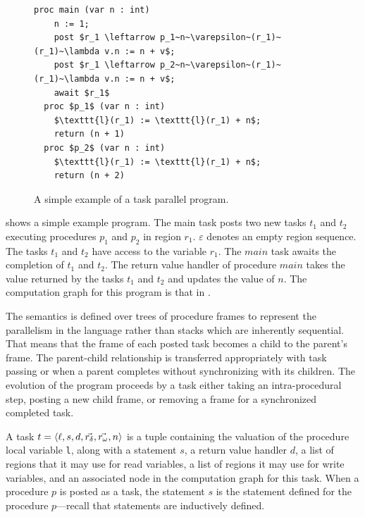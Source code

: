 \begin{figure}
\vspace{-1em}
  \begin{center}
    \begin{lstlisting}[mathescape=true]
  proc main (var n : int)
  	n := 1;
	post $r_1 \leftarrow p_1~n~\varepsilon~(r_1)~(r_1)~\lambda v.n := n + v$;
	post $r_1 \leftarrow p_2~n~\varepsilon~(r_1)~(r_1)~\lambda v.n := n + v$;
	await $r_1$
  proc $p_1$ (var n : int)
  	$\texttt{l}(r_1) := \texttt{l}(r_1) + n$;
	return (n + 1)
  proc $p_2$ (var n : int)
  	$\texttt{l}(r_1) := \texttt{l}(r_1) + n$;
	return (n + 2)
\end{lstlisting}
  \end{center}
  \vspace{-2em}
  \caption{A simple example of a task parallel program.}
  \label{fig:hj-async-finish}
  \vspace{-1em}
\end{figure}

 shows a simple example program. The main task posts two new tasks $t_1$ and $t_2$ executing procedures $p_1$ and $p_2$ in region $r_1$. $\varepsilon$ denotes an empty region sequence. The tasks $t_1$ and $t_2$ have access to the variable $r_1$. The $main$ task awaits the completion of $t_1$ and $t_2$. The return value handler of procedure $main$ takes the value returned by the tasks $t_1$ and $t_2$ and updates the value of $n$. The computation graph for this program is that in .


The semantics is defined over trees of procedure frames to represent the parallelism in the language rather than stacks which are inherently sequential. That means that the frame of each posted task becomes a child to the parent's frame. The parent-child relationship is transferred appropriately with task passing or when a parent completes without synchronizing with its children. The evolution of the program proceeds by a task either taking an intra-procedural step, posting a new child frame, or removing a frame for a synchronized completed task.

A task $t = \tuple{\ell, s, d, \vec{r_\delta}, \vec{r_\omega}, n}$ is a tuple containing the valuation of the procedure local variable \texttt{l}, along with a statement $s$, a return value handler $d$, a list of regions that it may use for read variables, a list of regions it may use for write variables, and an associated node in the computation graph for this task. When a procedure $p$ is posted as a task, the statement $s$ is the statement defined for the procedure $p$---recall that statements are inductively defined. 

